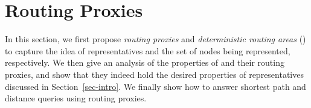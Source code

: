 \section{Routing Proxies}
\label{sec-proxy}



In this section, we first propose {\em routing  proxies} and {\em deterministic routing areas} (\dras) to capture the idea of representatives and the set of
nodes being represented, respectively. We then give an analysis of the properties of  \dras and their routing proxies, and show that they indeed hold the desired properties of representatives discussed in Section~\ref{sec-intro}.
We finally show how to answer shortest path and distance queries using routing proxies.








